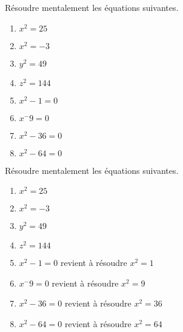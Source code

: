 \begin{exercice*}
    Résoudre mentalement les équations suivantes.
    \begin{multicols}{2}
        \begin{enumerate}
            \item $x^2=25$
            \item $x^2=-3$
            \item $y^2=49$
            \item $z^2=144$
            \item $x^2-1=0$
            \item $x^-9=0$
            \item $x^2-36=0$
            \item $x^2-64=0$
        \end{enumerate}
    \end{multicols}
\end{exercice*}
\begin{corrige}
    Résoudre mentalement les équations suivantes.

    \begin{enumerate}
        \item $x^2=25$
        
        \item $x^2=-3$
        
        \item $y^2=49$
        
        \item $z^2=144$
        
        \item $x^2-1=0$ revient à résoudre $x^2=1$
        
        \item $x^-9=0$ revient à résoudre $x^2=9$
        
    \end{enumerate}
    \Coupe
    \begin{enumerate}
        \setcounter{enumi}{6}
        \item $x^2-36=0$ revient à résoudre $x^2=36$
        
        \item $x^2-64=0$ revient à résoudre $x^2=64$
        
    \end{enumerate}
\end{corrige}
